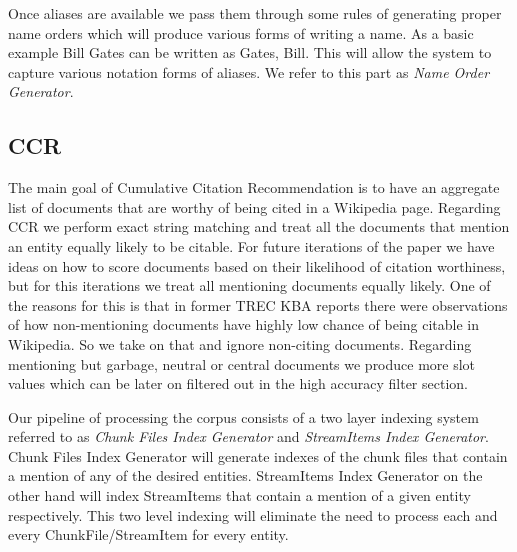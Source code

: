 Once aliases are available we pass them through some rules of generating proper name orders which will produce various forms of writing a name. As a basic example Bill Gates can be written as Gates, Bill. This will allow the system to capture various notation forms of aliases. We refer to this part as \textit{Name Order Generator}.

\subsection{CCR}

The main goal of Cumulative Citation Recommendation is to have an aggregate list of documents that are worthy of being cited in a Wikipedia page. Regarding CCR we perform exact string matching 
and treat all the documents that mention an entity equally likely to be citable.
For future iterations of the paper we have ideas on how to score documents 
based on their likelihood of citation worthiness, but for this iterations we 
treat all mentioning documents equally likely. One of the reasons for this is 
that in former TREC KBA reports \cite{JFrank12} there were observations of how 
non-mentioning documents have highly low chance of being citable in Wikipedia.
So we take on that and ignore non-citing documents. Regarding mentioning but 
garbage, neutral or central documents we produce more slot values which can be 
later on filtered out in the high accuracy filter section.

Our pipeline of processing the corpus consists of a two layer indexing system referred to as \textit{Chunk Files Index Generator} and \textit{StreamItems Index Generator}.  Chunk Files Index Generator will generate indexes of the chunk files that contain a mention of any of the desired entities. StreamItems Index Generator on the other hand will index StreamItems that contain a mention of a given entity respectively. This two level indexing will eliminate the need to process each and every ChunkFile/StreamItem for every entity. 







